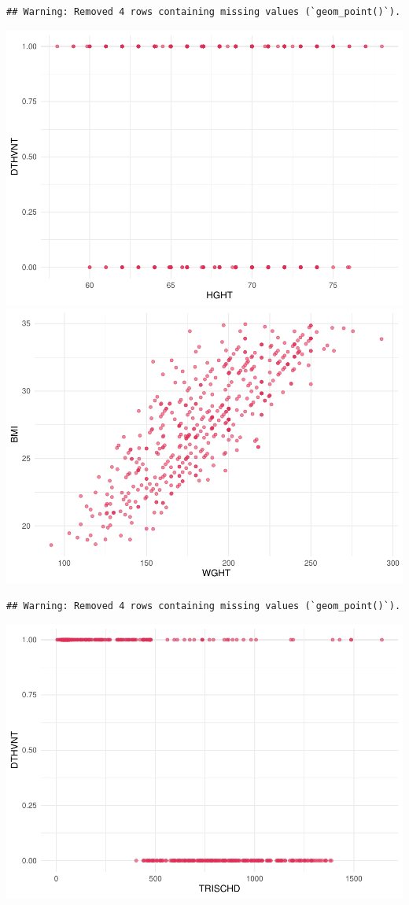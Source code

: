 \documentclass[
]{article}
\begin{document}
\begin{verbatim}
## Warning: Removed 4 rows containing missing values (`geom_point()`).
\end{verbatim}

\includegraphics{Q1_markdown_files/figure-latex/unnamed-chunk-7-7.pdf}
\includegraphics{Q1_markdown_files/figure-latex/unnamed-chunk-7-8.pdf}

\begin{verbatim}
## Warning: Removed 4 rows containing missing values (`geom_point()`).
\end{verbatim}

\includegraphics{Q1_markdown_files/figure-latex/unnamed-chunk-7-9.pdf}
\end{document}
